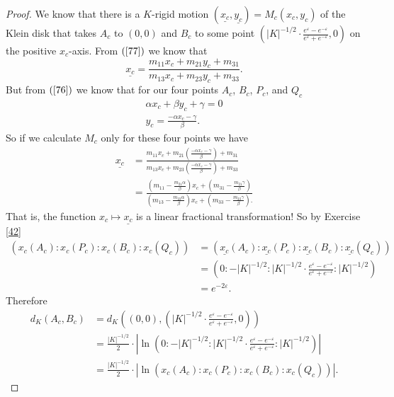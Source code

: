 \documentclass{ximera}
\begin{document}
\begin{proof}
We know that there is a $K$-rigid motion $\left(  \underline{x_{c}}%
,\underline{y_{c}}\right)  =M_{c}\left(  x_{c},y_{c}\right)  $ of the Klein
disk that takes $A_{c}$ to $\left(  0,0\right)  $ and $B_{c}$ to some point
$\left(  \left\vert K\right\vert ^{-1/2}\cdot %
\frac{e^{\varepsilon}-e^{-\varepsilon}}{e^{\varepsilon}+e^{-\varepsilon}%
},0\right)  $ on the positive $x_{c}$-axis. From $\left(  \ref{77}\right)  $
we know that%
\[
\underline{x_{c}}=\frac{m_{11}x_{c}+m_{21}y_{c}+m_{31}}{m_{13}x_{c}%
+m_{23}y_{c}+m_{33}}.
\]
But from $\left(  \ref{76}\right)  $ we know that for our four points $A_{c}$,
$B_{c}$, $P_{c}$, and $Q_{c}$
\begin{gather*}
\alpha x_{c}+\beta y_{c}+\gamma=0\\
y_{c}=\frac{-\alpha x_{c}-\gamma}{\beta}.
\end{gather*}
So if we calculate $M_{c}$ only for these four points we have%
\begin{align*}
\underline{x_{c}}  &  =\frac{m_{11}x_{c}+m_{21}\left(  \frac{-\alpha
x_{c}-\gamma}{\beta}\right)  +m_{31}}{m_{13}x_{c}+m_{23}\left(  \frac{-\alpha
x_{c}-\gamma}{\beta}\right)  +m_{33}}\\
&  =\frac{\left(  m_{11}-\frac{m_{21}\alpha}{\beta}\right)  x_{c}+\left(
m_{31}-\frac{m_{21}\gamma}{\beta}\right)  }{\left(  m_{13}-\frac{m_{23}\alpha
}{\beta}\right)  x_{c}+\left(  m_{33}-\frac{m_{23}\gamma}{\beta}\right)  .}%
\end{align*}
That is, the function $x_{c}\mapsto\underline{x_{c}}$ is a linear fractional
transformation! So by Exercise \ref{42}%
\begin{align*}
\left(  x_{c}\left(  A_{c}\right)  :x_{c}\left(  P_{c}\right)  :x_{c}\left(
B_{c}\right)  :x_{c}\left(  Q_{c}\right)  \right)   &  =\left(  \underline
{x_{c}}\left(  A_{c}\right)  :\underline{x_{c}}\left(  P_{c}\right)
:\underline{x_{c}}\left(  B_{c}\right)  :\underline{x_{c}}\left(
Q_{c}\right)  \right) \\
&  =\left(  0:-\left\vert K\right\vert ^{-1/2}:\left\vert K\right\vert
^{-1/2}\cdot \frac{e^{\varepsilon}-e^{-\varepsilon}%
}{e^{\varepsilon}+e^{-\varepsilon}}:\left\vert K\right\vert ^{-1/2}\right) \\
&  =e^{-2\varepsilon}.
\end{align*}
Therefore%
\begin{align*}
d_{K}\left(  A_{c},B_{c}\right)   &  =d_{K}\left(  \left(  0,0\right)
,\left(  \left\vert K\right\vert ^{-1/2}\cdot %
\frac{e^{\varepsilon}-e^{-\varepsilon}}{e^{\varepsilon}+e^{-\varepsilon}%
},0\right)  \right) \\
&  =\frac{\left\vert K\right\vert ^{-1/2}}{2}\cdot \left\vert \ln \left(  0:-\left\vert K\right\vert ^{-1/2}:\left\vert
K\right\vert ^{-1/2}\cdot \frac{e^{\varepsilon
}-e^{-\varepsilon}}{e^{\varepsilon}+e^{-\varepsilon}}:\left\vert K\right\vert
^{-1/2}\right)  \right\vert \\
&  =\frac{\left\vert K\right\vert ^{-1/2}}{2}\cdot \left\vert \ln \left(  x_{c}\left(  A_{c}\right)  :x_{c}\left(
P_{c}\right)  :x_{c}\left(  B_{c}\right)  :x_{c}\left(  Q_{c}\right)  \right)
\right\vert .
\end{align*}


\end{proof}
\end{document}
